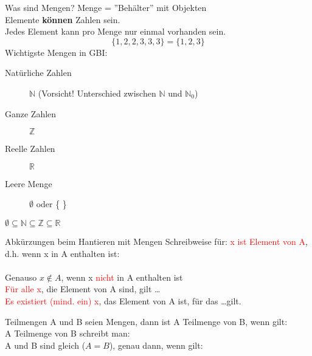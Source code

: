 \begin{frame}{Was sind Mengen?}
	Menge = ''Behälter'' mit Objekten\\
	Elemente \textbf{können} Zahlen sein.\\
	Jedes Element kann pro Menge nur einmal vorhanden sein.\\
	\begin{equation*}
		\lbrace 1, 2, 2, 3, 3, 3\rbrace = \lbrace 1, 2, 3\rbrace
	\end{equation*}
	Wichtigste Mengen in GBI:\\
	\begin{description}
		\item[Natürliche Zahlen] $\mathbb{N}$ (Vorsicht! Unterschied zwischen $\mathbb{N}$ und $\mathbb{N}_0$)
		\item[Ganze Zahlen] $\mathbb{Z}$
		\item[Reelle Zahlen] $\mathbb{R}$
		\item[Leere Menge] $\emptyset$ oder \{   \}
	\end{description}
	$\emptyset\subseteq\mathbb{N}\subseteq\mathbb{Z}\subseteq\mathbb{R}$
\end{frame}

\begin{frame}{Abkürzungen beim Hantieren mit Mengen}
	Schreibweise für: \textcolor{red}{x ist Element von A}, d.h. wenn x in A enthalten ist:\\
	\\
	Genauso $x \notin A$, wenn x \textcolor{red}{nicht} in A enthalten ist\\
	\textcolor{red}{Für alle x}, die Element von A sind, gilt \dots\\
	\textcolor{red}{Es existiert (mind. ein) x}, das Element von A ist, für das \dots gilt.
\end{frame}

\begin{frame}{Teilmengen}
	A und B seien Mengen, dann ist A Teilmenge von B, wenn gilt:
	\\
	A Teilmenge von B schreibt man:
	\\
	A und B sind gleich ($A = B$), genau dann, wenn gilt:
\end{frame}

